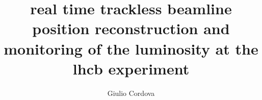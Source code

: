\title{real time trackless beamline position reconstruction and monitoring of
the luminosity at the lhcb experiment}
\author{Giulio Cordova}



